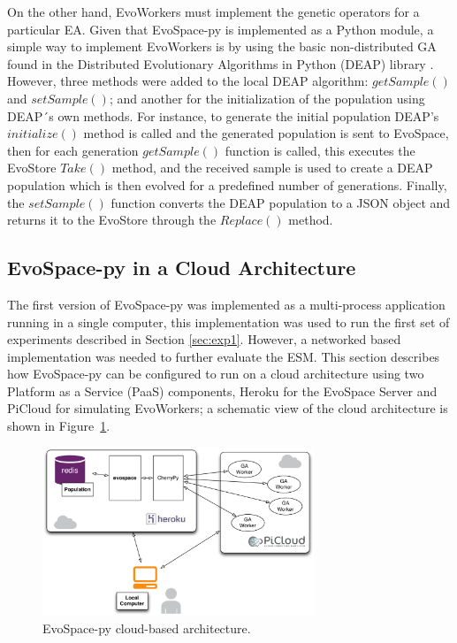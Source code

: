On the other hand, EvoWorkers must implement the genetic operators for a particular EA.
Given that EvoSpace-py is implemented as a Python module, a simple way to implement EvoWorkers is by using the basic non-distributed GA found in the Distributed Evolutionary Algorithms in Python (DEAP) library \cite{DEAP_JMLR2012}. 
However, three methods were added to the local DEAP algorithm: $getSample()$ and  $setSample()$; and  another for the  initialization of the population using DEAP´s own methods.
For instance, to generate the initial population DEAP's $initialize()$ method  is called and the generated population is sent to EvoSpace, then for each generation $getSample()$ function is called, this executes the EvoStore $Take()$ method, and the received sample is used to create a DEAP population which is then evolved for a predefined number of generations.
Finally, the $setSample()$ function converts the DEAP population to a JSON object and returns it to the EvoStore through the $Replace()$ method.   

\subsection{EvoSpace-py in a Cloud Architecture}
The first version of EvoSpace-py was implemented as a multi-process application running in a single computer, this implementation was used to run the first set of experiments described in Section \ref{sec:exp1}.
However, a networked based implementation was needed to further evaluate the ESM.  
This section describes how EvoSpace-py can be configured to run on a cloud architecture using two Platform as a Service (PaaS) components, Heroku for the EvoSpace Server and PiCloud for simulating EvoWorkers; a schematic view of the cloud architecture is shown in Figure~\ref{herokuPiCloud}.

\begin{figure}[t]
\centering
\includegraphics[width=3.2in]{herokuPiCloud.eps}
\caption{EvoSpace-py cloud-based architecture.}
\label{herokuPiCloud}
\end{figure}

